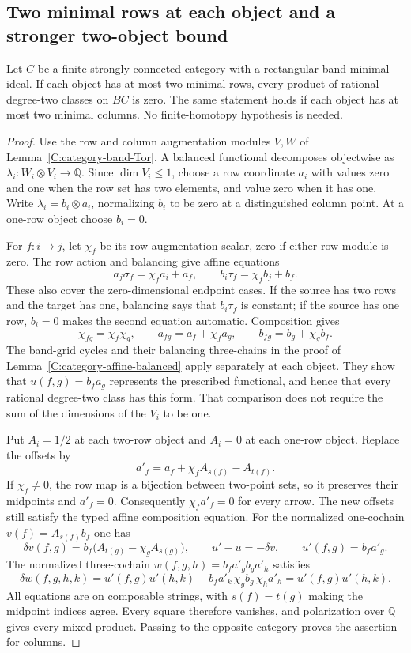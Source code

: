 \subsection{Two minimal rows at each object and a stronger two-object bound}

\begin{proposition}\label{C:objectwise-two-row-cups}
Let $C$ be a finite strongly connected category with a
rectangular-band minimal ideal.  If each object has at most two
minimal rows, every product of rational degree-two classes on
$BC$ is zero.  The same statement holds if each object has at
most two minimal columns.  No finite-homotopy hypothesis is needed.
\end{proposition}
\begin{proof}
Use the row and column augmentation modules $V,W$ of
Lemma~\ref{C:category-band-Tor}.  A balanced functional decomposes
objectwise as $\lambda_i:W_i\otimes V_i\to\mathbb Q$.
Since $\dim V_i\leq1$, choose a row coordinate $a_i$ with values
zero and one when the row set has two elements, and value zero
when it has one.  Write $\lambda_i=b_i\otimes a_i$, normalizing
$b_i$ to be zero at a distinguished column point.  At a one-row
object choose $b_i=0$.

For $f:i\to j$, let $\chi_f$ be its row augmentation scalar,
zero if either row module is zero.  The row action and balancing
give affine equations
\[
 a_j\sigma_f=\chi_f a_i+a_f,
 \qquad b_i\tau_f=\chi_f b_j+b_f.
\]
These also cover the zero-dimensional endpoint cases.  If the
source has two rows and the target has one, balancing says that
$b_i\tau_f$ is constant; if the source has one row, $b_i=0$
makes the second equation automatic.  Composition gives
\[
 \chi_{fg}=\chi_f\chi_g,\qquad
 a_{fg}=a_f+\chi_f a_g,\qquad
 b_{fg}=b_g+\chi_g b_f.
\]
The band-grid cycles and their balancing three-chains in the proof
of Lemma~\ref{C:category-affine-balanced} apply separately at
each object.  They show that $u(f,g)=b_fa_g$ represents the
prescribed functional, and hence that every rational degree-two
class has this form.  That comparison does not require the
sum of the dimensions of the $V_i$ to be one.

Put $A_i=1/2$ at each two-row object and $A_i=0$ at each
one-row object.  Replace the offsets by
\[
 a'_f=a_f+\chi_f A_{s(f)}-A_{t(f)}.
\]
If $\chi_f\ne0$, the row map is a bijection between two-point
sets, so it preserves their midpoints and $a'_f=0$.
Consequently $\chi_fa'_f=0$ for every arrow.  The new offsets
still satisfy the typed affine composition equation.
For the normalized one-cochain $v(f)=A_{s(f)}b_f$ one has
\[
 \delta v(f,g)=b_f\bigl(A_{t(g)}-\chi_g A_{s(g)}\bigr),
 \qquad u'-u=-\delta v,
 \qquad u'(f,g)=b_fa'_g.
\]
The normalized three-cochain
$w(f,g,h)=b_fa'_g b_ga'_h$ satisfies
\[
 \delta w(f,g,h,k)
 =u'(f,g)u'(h,k)
  +b_fa'_k\,\chi_gb_g\,\chi_ha'_h
 =u'(f,g)u'(h,k).
\]
All equations are on composable strings, with
$s(f)=t(g)$ making the midpoint indices agree.
Every square therefore vanishes, and polarization over
$\mathbb Q$ gives every mixed product.  Passing to the opposite
category proves the assertion for columns.
\end{proof}

